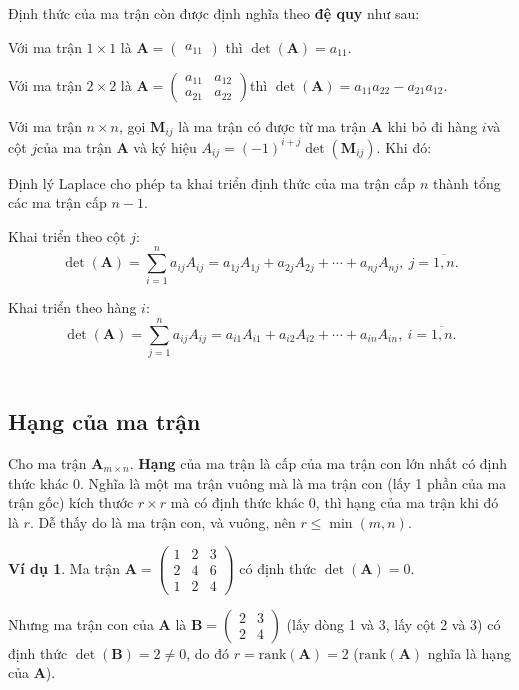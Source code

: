 \documentclass{mynotes}
\theoremstyle{definition}
\newtheorem{example}{Ví dụ}
\begin{document}
Định thức của ma trận còn được định nghĩa theo \textbf{đệ quy} như sau:

Với ma trận $1 \times 1$ là $\bm{A}=\begin{pmatrix}a_{11}\end{pmatrix}$ thì $\det(\bm{A})=a_{11}$.

Với ma trận $2 \times 2$ là $\bm{A} = \begin{pmatrix}a_{11} & a_{12} \\ a_{21} & a_{22}\end{pmatrix}$​ thì $\det(\bm{A})=a_{11}a_{22} - a_{21}a_{12}$.

Với ma trận $n \times n$, gọi $\bm{M}_{ij}$ là ma trận có được từ ma trận $\bm{A}$ khi bỏ đi hàng $i$​ và cột $j$​ của ma trận $\bm{A}$ và ký hiệu $A_{ij}=(-1)^{i+j} \det (\bm{M}_{ij})$. Khi đó:

\begin{theorem}
    Định lý Laplace cho phép ta khai triển định thức của ma trận cấp $n$ thành tổng các ma trận cấp $n-1$.

    Khai triển theo cột $j$​: \[ \det(\bm{A})=\displaystyle{\sum_{i=1}^na_{ij} A_{ij}} = a_{1j} A_{1j} + a_{2j} A_{2j} + \cdots + a_{nj} A_{nj},\ j = \overline{1, n}.\]

    Khai triển theo hàng $i$​: \[ \det(\bm{A})=\displaystyle{\sum_{j=1}^n a_{ij} A_{ij}} = a_{i1} A_{i1} + a_{i2} A_{i2} + \cdots + a_{in} A_{in},\ i = \overline{1, n}. \]​
\end{theorem}

\subsection*{Hạng của ma trận}

\begin{definition}
    Cho ma trận $\mathbf{A}_{m \times n}$. \textbf{Hạng} của ma trận là cấp của ma trận con lớn nhất có định thức khác 0. Nghĩa là một ma trận vuông mà là ma trận con (lấy 1 phần của ma trận gốc) kích thước $r \times r$ mà có định thức khác 0, thì hạng của ma trận khi đó là $r$. Dễ thấy do là ma trận con, và vuông, nên $r \leqslant \min(m, n)$.
\end{definition}

\begin{example}
    Ma trận $\bm{A} = \begin{pmatrix}
        1 & 2 & 3 \\ 2 & 4 & 6 \\ 1 & 2 & 4
    \end{pmatrix}$ có định thức $\det(\bm{A}) = 0$. 
    
    Nhưng ma trận con của $\bm{A}$ là $\bm{B} = \begin{pmatrix}2 & 3 \\ 2 & 4\end{pmatrix}$ (lấy dòng 1 và 3, lấy cột 2 và 3) có định thức $\det(\bm{B}) = 2 \neq 0$, do đó $r = \text{rank}(\bm{A}) = 2$ ($\text{rank}(\bm{A})$ nghĩa là hạng của $\bm{A}$).
\end{example}
\end{document}
